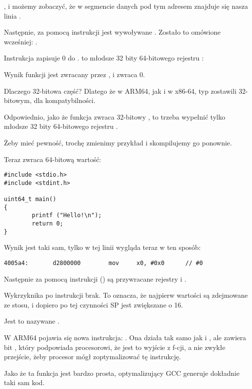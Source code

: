, i możemy zobaczyć, że w segmencie danych  pod tym adresem znajduje się nasza
linia .

Następnie, za pomocą instrukcji  jest wywoływane \puts. Zostało to omówione wcześniej: .

Instrukcja \MOV zapisuje 0 do . 
 to młodsze 32 bity 64-bitowego rejestru :



Wynik funkcji jest zwracany przez , i \main zwraca 0.

Dlaczego 32-bitowa część?
Dlatego że w ARM64, jak i w x86-64, typ \Tint zostawili 32-bitowym, dla kompatybilności.

Odpowiednio, jako że funkcja zwraca 32-bitowy \Tint, to trzeba wypełnić tylko młodsze 32 bity 64-bitowego rejestru .

Żeby mieć pewność, trochę zmienimy przykład i skompilujemy go ponownie.%

Teraz \main zwraca 64-bitową wartość:

\begin{lstlisting}[caption=\main zwracające wartość typu \TT{uint64\_t},style=customc]
#include <stdio.h>
#include <stdint.h>

uint64_t main()
{
        printf ("Hello!\n");
        return 0;
}
\end{lstlisting}

Wynik jest taki sam, tylko \MOV w tej linii wygląda teraz w ten sposób:

\begin{lstlisting}[caption=\NonOptimizing GCC 4.8.1 + objdump]
  4005a4:       d2800000        mov     x0, #0x0      // #0
\end{lstlisting}

Następnie za pomocą instrukcji  () są przywracane rejestry  i .

Wykrzyknika po instrukcji brak. To oznacza, że najpierw wartości są zdejmowane ze stosu, i dopiero po tej czynności \ac{SP} jest zwiększane o 16.

Jest to nazywane .

W ARM64 pojawia się nowa instrukcja: \RET. 
Ona działa tak samo jak i , ale zawiera bit ,
który podpowiada procesorowi, że jest to wyjście z f-cji, a nie zwykłe przejście, żeby procesor mógł zoptymalizować tę instrukcję.

Jako że ta funkcja jest bardzo prosta, optymalizujący GCC generuje dokładnie taki sam kod.


